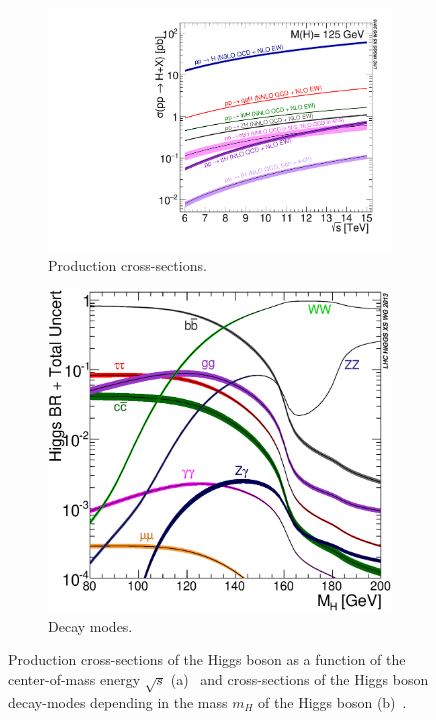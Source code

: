 \begin{figure}[htb]
    \centering
    \begin{subfigure}[t]{0.45\textwidth}
        \includegraphics[width=\textwidth]{./figures/theory/higgs_xsec_production.pdf}
        \caption{Production cross-sections.}\label{fig:theory:higgs:xsecs}
    \end{subfigure}
    \begin{subfigure}[t]{0.45\textwidth}
        \includegraphics[width=\textwidth]{./figures/theory/higgs_xsec_decay.eps}
        \caption{Decay modes.}\label{fig:theory:higgs:br}
    \end{subfigure}
    \caption{Production cross-sections of the Higgs boson as a function of the center-of-mass energy $\sqrt{s}$ (a)~\cite{YR4}
             and cross-sections of the Higgs boson decay-modes depending in the mass $m_H$ of the Higgs boson (b)~\cite{YR3}.}
\end{figure}

